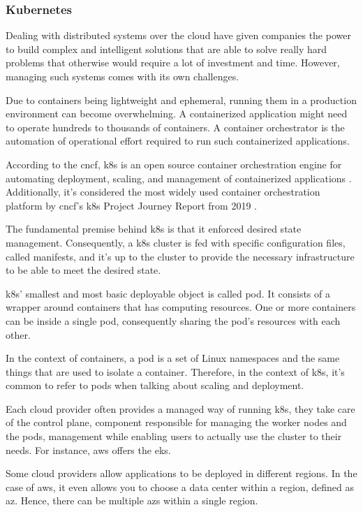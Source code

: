 \subsubsection{Kubernetes}

Dealing with distributed systems over the cloud have given companies the power to build complex and intelligent solutions that are able to solve really hard problems that otherwise would require a lot of investment and time. However, managing such systems comes with its own challenges.

Due to containers being lightweight and ephemeral, running them in a production environment can become overwhelming. A containerized application might need to operate hundreds to thousands of containers. A container orchestrator is the automation of operational effort required to run such containerized applications.

According to the \gls{cncf}, \gls{k8s} is an open source container orchestration engine for automating deployment, scaling, and management of containerized applications \cite{kubernetes}. Additionally, it’s considered the most widely used container orchestration platform by \gls{cncf}’s \gls{k8s} Project Journey Report from 2019 \cite{cncf_k8s_report}.

The fundamental premise behind \gls{k8s} is that it enforced desired state management. Consequently, a \gls{k8s} cluster is fed with specific configuration files, called manifests, and it's up to the cluster to provide the necessary infrastructure to be able to meet the desired state.

\gls{k8s}’ smallest and most basic deployable object is called pod. It consists of a wrapper around containers that has computing resources. One or more containers can be inside a single pod, consequently sharing the pod’s resources with each other.

In the context of containers, a pod is a set of Linux namespaces and the same things that are used to isolate a container. Therefore, in the context of \gls{k8s}, it’s common to refer to pods when talking about scaling and deployment.

Each cloud provider often provides a managed way of running \gls{k8s}, they take care of the control plane, component responsible for managing the worker nodes and the pods, management while enabling users to actually use the cluster to their needs. For instance, \gls{aws} offers the \gls{eks}.

Some cloud providers allow applications to be deployed in different regions. In the case of \gls{aws}, it even allows you to choose a data center within a region, defined as \gls{az}. Hence, there can be multiple \gls{az}s within a single region.

